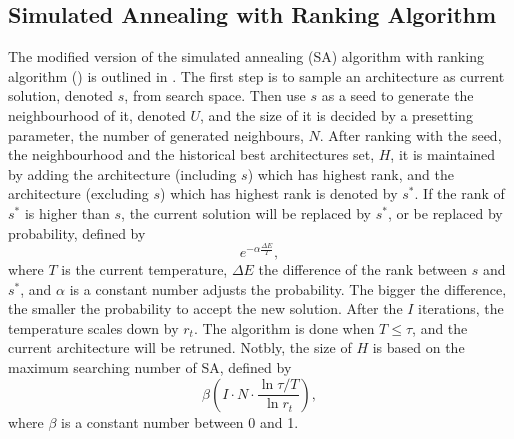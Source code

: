 \documentclass[sigconf]{acmart}
\begin{document}
    \subsection{Simulated Annealing with Ranking Algorithm}

    The modified version of the simulated annealing (SA) algorithm with ranking algorithm (\palg)
    is outlined in . The first step is to sample an architecture as current 
    solution, denoted $s$, from search space. Then use $s$ as a seed to generate the 
    neighbourhood of it, denoted $U$, and the size of it is decided by a presetting parameter, 
    the number of generated neighbours, $N$. 
    After ranking with the seed, the neighbourhood and the historical best architectures set, $H$, 
    it is maintained by adding the architecture (including $s$) which has highest rank, and 
    the architecture (excluding $s$) which has highest rank is denoted by $s^*$. 
    If the rank of $s^*$ is higher than $s$, the current solution will be 
    replaced by $s^*$, or be replaced by probability, defined by 
    \begin{equation}
        \label{equ:SA_rk_prob}
        e^{-\alpha\frac{\Delta E}{T}},
    \end{equation}
    where $T$ is the current temperature, $\Delta E$ the difference of the rank between 
    $s$ and $s^*$, and $\alpha$ is a constant number adjusts the probability. The bigger 
    the difference, the smaller the probability to accept the new solution. 
    After the $I$ iterations, the temperature scales down by $r_t$. The algorithm 
    is done when $T\leq\tau$, and the current architecture will be retruned. 
    Notbly, the size of $H$ is based on the maximum searching number of SA, defined by 
    \begin{equation}
        \label{equ:SA_rk_size_of_H}
        \beta (I\cdot N\cdot\frac{\ln{\tau/T}}{\ln{r_t}}),
    \end{equation}
    where $\beta$ is a constant number between 0 and 1.
\end{document}
